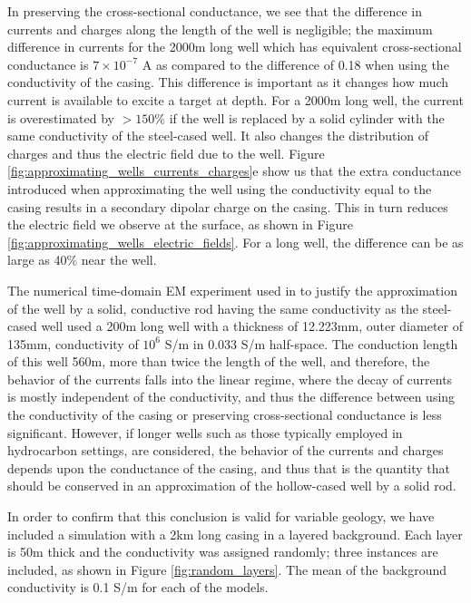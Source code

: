 In preserving the cross-sectional conductance, we see that the difference in currents and charges along the length of the well is negligible;  the maximum difference in currents for the 2000m long well which has equivalent cross-sectional conductance is $7\times10^{-7}$ A as compared to the difference of 0.18 when using the conductivity of the casing. This difference is important as it changes how much current is available to excite a target at depth. For a 2000m long well, the current is overestimated by $> 150\%$ if the well is replaced by a solid cylinder with the same conductivity of the steel-cased well. It also changes the distribution of charges and thus the electric field due to the well. Figure \ref{fig:approximating_wells_currents_charges}e show us that the extra conductance introduced when approximating the well using the conductivity equal to the casing results in a secondary dipolar charge on the casing. This in turn reduces the electric field we observe at the surface, as shown in Figure \ref{fig:approximating_wells_electric_fields}. For a long well, the difference can be as large as 40\% near the well.



The numerical time-domain EM experiment used in \cite{Um2015} to justify the approximation of the well by a solid, conductive rod having the same conductivity as the steel-cased well used a 200m long well with a thickness of 12.223mm, outer diameter of 135mm, conductivity of $10^{6}$ S/m in 0.033 S/m half-space. The conduction length of this well 560m, more than twice the length of the well, and therefore, the behavior of the currents falls into the linear regime, where the decay of currents is mostly independent of the conductivity, and thus the difference between using the conductivity of the casing or preserving cross-sectional conductance is less significant. However, if longer wells such as those typically employed in hydrocarbon settings, are considered, the behavior of the currents and charges depends upon the conductance of the casing, and thus that is the quantity that should be conserved in an approximation of the hollow-cased well by a solid rod.

In order to confirm that this conclusion is valid for variable geology, we have included a simulation with a 2km long casing in a layered background. Each layer is 50m thick and the conductivity was assigned randomly; three instances are included, as shown in Figure \ref{fig:random_layers}. The mean of the background conductivity is 0.1 S/m for each of the models.

